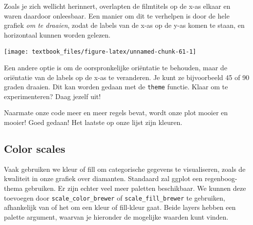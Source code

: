 \documentclass[]{tufte-book}
\newenvironment{Shaded}{}{}
\newcommand{\DecValTok}[1]{\textcolor[rgb]{0.25,0.63,0.44}{#1}}
\newcommand{\KeywordTok}[1]{\textcolor[rgb]{0.00,0.44,0.13}{\textbf{#1}}}
\newcommand{\NormalTok}[1]{#1}
\newcommand{\OperatorTok}[1]{\textcolor[rgb]{0.40,0.40,0.40}{#1}}
\newcommand{\StringTok}[1]{\textcolor[rgb]{0.25,0.44,0.63}{#1}}
\begin{document}
Zoals je zich wellicht herinnert, overlapten de filmtitels op de x-as elkaar en waren daardoor onleesbaar. Een manier om dit te verhelpen is door de hele grafiek \emph{om te draaien}, zodat de labels van de x-as op de y-as komen te staan, en horizontaal kunnen worden gelezen.

\begin{Shaded}
\end{Shaded}

\texttt{[image: textbook\_files/figure-latex/unnamed-chunk-61-1]}

Een andere optie is om de oorspronkelijke oriëntatie te behouden, maar de oriëntatie van de labels op de x-as te veranderen. Je kunt ze bijvoorbeeld 45 of 90 graden draaien. Dit kan worden gedaan met de \texttt{theme} functie. Klaar om te experimenteren? Daag jezelf uit!

Naarmate onze code meer en meer regels bevat, wordt onze plot mooier en mooier! Goed gedaan! Het laatste op onze lijst zijn kleuren.

\hypertarget{color-scales}{%
\subsection{Color scales}\label{color-scales}}

Vaak gebruiken we kleur of fill om categorische gegevens te visualiseren, zoals de kwaliteit in onze grafiek over diamanten. Standaard zal ggplot een regenboog-thema gebruiken. Er zijn echter veel meer paletten beschikbaar. We kunnen deze toevoegen door \texttt{scale\_color\_brewer} of \texttt{scale\_fill\_brewer} te gebruiken, afhankelijk van of het om een kleur of fill-kleur gaat. Beide layers hebben een palette argument, waarvan je hieronder de mogelijke waarden kunt vinden.
\end{document}
